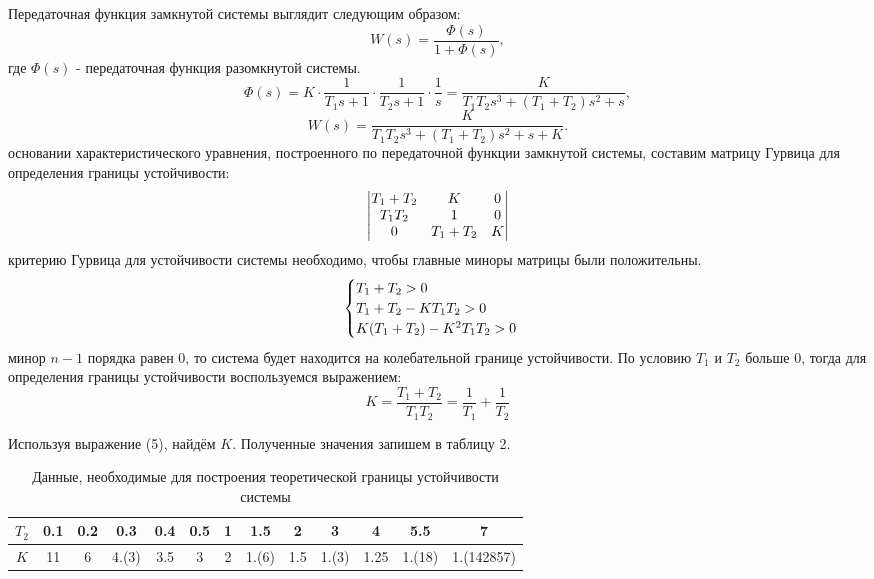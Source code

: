 \documentclass[12pt,a4paper]{article}
\begin{document}
 
Передаточная функция замкнутой системы выглядит следующим образом:
\begin{equation} W(s) = \frac{\Phi(s)}{1 + \Phi(s)}, \end{equation}
где $\Phi(s)$ - передаточная функция разомкнутой системы.
\begin{equation} 
\Phi(s) = K\cdot\frac{1}{T_1s + 1}\cdot\frac{1}{T_2s + 1}\cdot\frac{1}{s} = \frac{K}{T_1T_2s^3 + (T_1 + T_2)s^2 +s},
\end{equation}
 \begin{equation} W(s) = \frac{K}{T_1T_2s^3 + (T_1 + T_2)s^2 +s + K}. \end{equation}
 основании характеристического уравнения, построенного по передаточной функции замкнутой системы, составим матрицу Гурвица для определения границы устойчивости:
\[
\begin{vmatrix}
$$T_1 + T_2$$ & $$K$$ & 0\\
$$T_1T_2$$ & 1 & 0\\
0 & $$T_1 + T_2$$ & $$K$$
\end{vmatrix}
\]
 критерию Гурвица для устойчивости системы необходимо, чтобы главные миноры матрицы были положительны. 
\begin{equation}
    \begin{cases}
        $$T_1 + T_2 > 0$$\\
        $$T_1 + T_2 - KT_1T_2 > 0$$\\
        $$K(T_1 + T_2) - K^2T_1T_2 > 0$$
    \end{cases}
\end{equation}
 минор $n - 1$ порядка равен 0, то система будет находится на колебательной границе устойчивости. По условию $T_1$ и $T_2$ больше 0, тогда для определения границы устойчивости воспользуемся выражением:
\begin{equation}
    K = \frac{T_1 + T_2}{T_1T_2} =  \frac{1}{T_1} + \frac{1}{T_2}
\end{equation}
    
Используя выражение (5), найдём $K$. Полученные значения запишем в таблицу 2.
\begin{table}[h!]
	\caption{Данные, необходимые для построения теоретической границы устойчивости системы}
	\renewcommand{\arraystretch}{1.8} %
	\begin{tabular}{|c|c|c|c|c|c|c|c|c|c|c|c|c|}
		\hline $T_2$ & 0.1 & 0.2 & 0.3 & 0.4 & 0.5 & 1 & 1.5 & 2 & 3 & 4 & 5.5 & 7\\
		\hline $K$ & 11 & 6 & 4.(3) & 3.5 & 3 & 2 & 1.(6) & 1.5 & 1.(3) & 1.25 & 1.(18) & 1.(142857)\\
		\hline
	\end{tabular}	
\end{table}  
 
\end{document}
